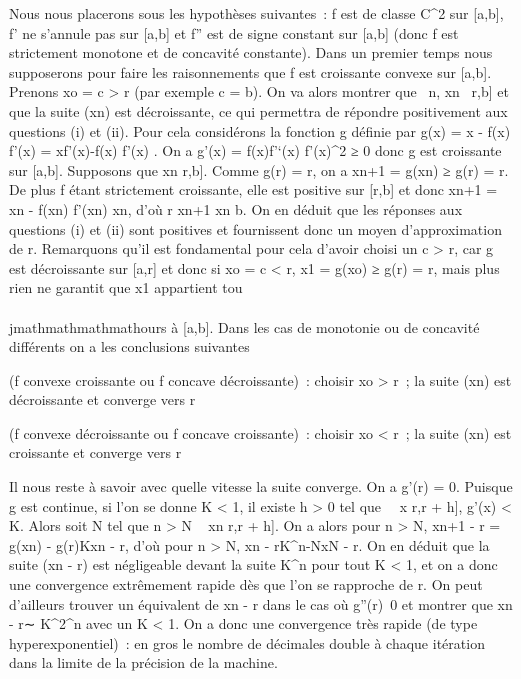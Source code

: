 Nous nous placerons sous les hypothèses suivantes~: f est de classe
C^2 sur {[}a,b{]}, f' ne s'annule pas sur {[}a,b{]} et f''
est de signe constant sur {[}a,b{]} (donc f est strictement monotone et
de concavité constante). Dans un premier temps nous supposerons pour
faire les raisonnements que f est croissante convexe sur {[}a,b{]}.
Prenons xo = c \textgreater{} r (par exemple c = b). On va
alors montrer que \forall~n, xn~ \in {[}r,b{]}
et que la suite (xn) est décroissante, ce qui permettra de
répondre positivement aux questions (i) et (ii). Pour cela considérons
la fonction g définie par g(x) = x - f(x) \over f'(x)
= xf'(x)-f(x) \over f'(x) . On a g'(x) = f(x)f'`(x)
\over f'(x)^2 ≥ 0 donc g est croissante sur
{[}a,b{]}. Supposons que xn \in {[}r,b{]}. Comme g(r) = r, on a
xn+1 = g(xn) ≥ g(r) = r. De plus f étant strictement
croissante, elle est positive sur {[}r,b{]} et donc xn+1 =
xn - f(xn) \over f'(xn)
\leq xn, d'où r \leq xn+1 \leq xn \leq b. On en déduit
que les réponses aux questions (i) et (ii) sont positives et fournissent
donc un moyen d'approximation de r. Remarquons qu'il est fondamental
pour cela d'avoir choisi un c \textgreater{} r, car g est décroissante
sur {[}a,r{]} et donc si xo = c \textless{} r, x1 =
g(xo) ≥ g(r) = r, mais plus rien ne garantit que x1
appartient tou\\\\jmathmathmathmathours à {[}a,b{]}. Dans les cas de monotonie ou de
concavité différents on a les conclusions suivantes

(f convexe croissante ou f concave décroissante)~: choisir xo
\textgreater{} r~; la suite (xn) est décroissante et converge
vers r

(f convexe décroissante ou f concave croissante)~: choisir xo
\textless{} r~; la suite (xn) est croissante et converge vers
r

Il nous reste à savoir avec quelle vitesse la suite converge. On a g'(r)
= 0. Puisque g est continue, si l'on se donne K \textless{} 1, il existe
h \textgreater{} 0 tel que \forall~~x \in {[}r,r + h{]},
\textbar{}g'(x)\textbar{} \textless{} K. Alors soit N tel que n
\textgreater{} N \rigtharrow~ xn \in {[}r,r + h{]}. On a alors pour n
\textgreater{} N, \textbar{}xn+1 - r\textbar{} =
\textbar{}g(xn) - g(r)\textbar{}\leq K\textbar{}xn -
r\textbar{}, d'où pour n \textgreater{} N, \textbar{}xn -
r\textbar{}\leq K^n-N\textbar{}xN - r\textbar{}. On en
déduit que la suite (xn - r) est négligeable devant la suite
K^n pour tout K \textless{} 1, et on a donc une convergence
extrêmement rapide dès que l'on se rapproche de r. On peut d'ailleurs
trouver un équivalent de \textbar{}xn - r\textbar{} dans le
cas où g''(r)\neq~0 et montrer que
\textbar{}xn - r\textbar{}∼ K^2^n  avec
un K \textless{} 1. On a donc une convergence très rapide (de type
hyperexponentiel)~: en gros le nombre de décimales double à chaque
itération dans la limite de la précision de la machine.

